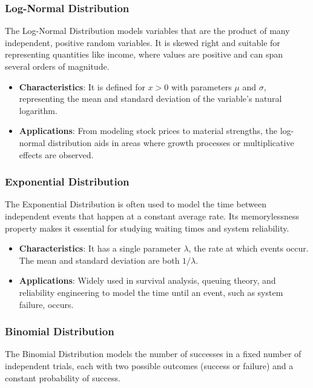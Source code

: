 \subsubsection*{Log-Normal Distribution}

The Log-Normal Distribution models variables that are the product of many independent, positive random variables. It is skewed right and suitable for representing quantities like income, where values are positive and can span several orders of magnitude.

\begin{itemize}
    \item \textbf{Characteristics}: It is defined for \(x > 0\) with parameters \(\mu\) and \(\sigma\), representing the mean and standard deviation of the variable's natural logarithm. 
    \item \textbf{Applications}: From modeling stock prices to material strengths, the log-normal distribution aids in areas where growth processes or multiplicative effects are observed.
\end{itemize}

\subsubsection*{Exponential Distribution}

The Exponential Distribution is often used to model the time between independent events that happen at a constant average rate. Its memorylessness property makes it essential for studying waiting times and system reliability.


\begin{itemize}
    \item \textbf{Characteristics}: It has a single parameter \( \lambda \), the rate at which events occur. The mean and standard deviation are both \(1/\lambda\).
    \item \textbf{Applications}: Widely used in survival analysis, queuing theory, and reliability engineering to model the time until an event, such as system failure, occurs.
\end{itemize}

\subsubsection*{Binomial Distribution}

The Binomial Distribution models the number of successes in a fixed number of independent trials, each with two possible outcomes (success or failure) and a constant probability of success. 

